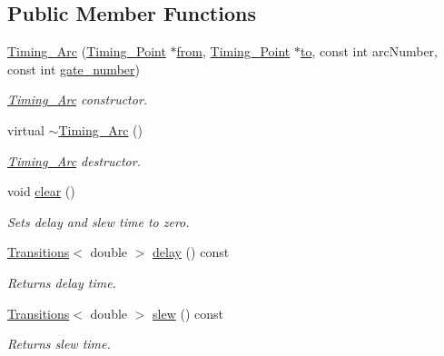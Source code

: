 \subsection*{Public Member Functions}
\begin{DoxyCompactItemize}
\item 
\hyperlink{classTiming__Analysis_1_1Timing__Arc_a38312efc7070c651743a667568514162}{Timing\-\_\-\-Arc} (\hyperlink{classTiming__Analysis_1_1Timing__Point}{Timing\-\_\-\-Point} $\ast$\hyperlink{classTiming__Analysis_1_1Edge_a47020ea89fd9fde438adc814a731a23d}{from}, \hyperlink{classTiming__Analysis_1_1Timing__Point}{Timing\-\_\-\-Point} $\ast$\hyperlink{classTiming__Analysis_1_1Single__Fanout__Edge_ac01deccce158b6cee6883924e6dcb788}{to}, const int arc\-Number, const int \hyperlink{classTiming__Analysis_1_1Timing__Arc_abd085ce8fe10d00d6e0be2668773b32f}{gate\-\_\-number})
\begin{DoxyCompactList}\small\item\em \hyperlink{classTiming__Analysis_1_1Timing__Arc}{Timing\-\_\-\-Arc} constructor. \end{DoxyCompactList}\item 
virtual \hyperlink{classTiming__Analysis_1_1Timing__Arc_a32909fb0fdc3bd5f2a13cdb9f9b351b8}{$\sim$\-Timing\-\_\-\-Arc} ()
\begin{DoxyCompactList}\small\item\em \hyperlink{classTiming__Analysis_1_1Timing__Arc}{Timing\-\_\-\-Arc} destructor. \end{DoxyCompactList}\item 
void \hyperlink{classTiming__Analysis_1_1Timing__Arc_a092de659dd0846a3e899f0efd9c34397}{clear} ()
\begin{DoxyCompactList}\small\item\em Sets delay and slew time to zero. \end{DoxyCompactList}\item 
\hyperlink{classTransitions}{Transitions}$<$ double $>$ \hyperlink{classTiming__Analysis_1_1Timing__Arc_a6561e6eb77cc7536f5515db318b233ce}{delay} () const 
\begin{DoxyCompactList}\small\item\em Returns delay time. \end{DoxyCompactList}\item 
\hyperlink{classTransitions}{Transitions}$<$ double $>$ \hyperlink{classTiming__Analysis_1_1Timing__Arc_a9846eb6bd9afc2cd8cbb0f926daf39a5}{slew} () const 
\begin{DoxyCompactList}\small\item\em Returns slew time. \end{DoxyCompactList}\item 

\end{DoxyCompactItemize}
